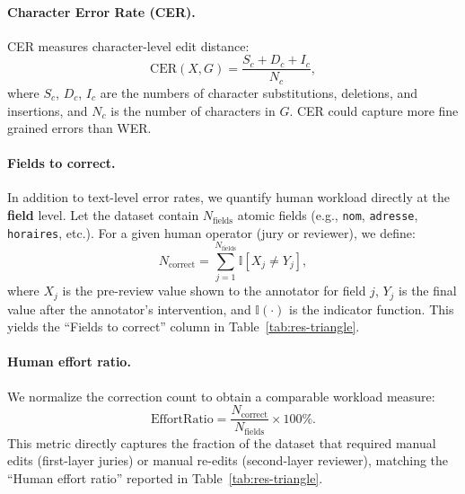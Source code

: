 \paragraph{Character Error Rate (CER).}
CER measures character-level edit distance:
\begin{equation}
    \mathrm{CER}(X, G) = \frac{S_c + D_c + I_c}{N_c},
\end{equation}
where $S_c$, $D_c$, $I_c$ are the numbers of character substitutions, deletions, and insertions, and $N_c$ is the number of characters in $G$.
CER could capture more fine grained errors than WER.

\paragraph{Fields to correct.}
In addition to text-level error rates, we quantify human workload directly at the \textbf{field} level. Let the dataset contain $N_{\text{fields}}$ atomic fields (e.g., \texttt{nom}, \texttt{adresse}, \texttt{horaires}, etc.). For a given human operator (jury or reviewer), we define:
\begin{equation}
    N_{\text{correct}} = \sum_{j=1}^{N_{\text{fields}}} \mathbb{I}\left[X_j \neq Y_j\right],
\end{equation}
where $X_j$ is the pre-review value shown to the annotator for field $j$, $Y_j$ is the final value after the annotator's intervention, and $\mathbb{I}(\cdot)$ is the indicator function. This yields the ``Fields to correct'' column in Table~\ref{tab:res-triangle}.

\paragraph{Human effort ratio.}
We normalize the correction count to obtain a comparable workload measure:
\begin{equation}
    \mathrm{EffortRatio} = \frac{N_{\text{correct}}}{N_{\text{fields}}} \times 100\%.
\end{equation}
This metric directly captures the fraction of the dataset that required manual edits (first-layer juries) or manual re-edits (second-layer reviewer), matching the ``Human effort ratio'' reported in Table~\ref{tab:res-triangle}.

